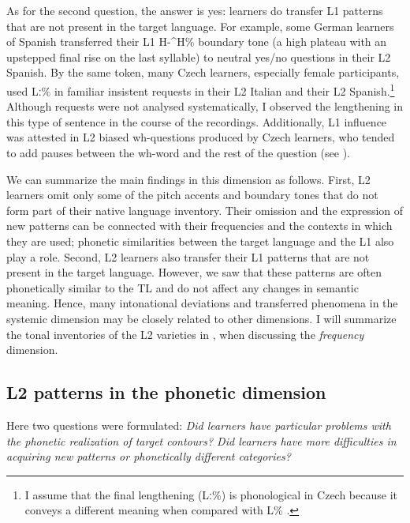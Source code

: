 As for the second question, the answer is yes: learners do transfer L1 patterns that are not present in the target language. For example, some German learners of Spanish transferred their L1 H-\^{}H\% boundary tone (a high plateau with an upstepped final rise on the last syllable) to neutral yes/no questions in their L2 Spanish. By the same token, many Czech learners, especially female participants, used Lː\% in familiar insistent requests in their L2 Italian and their L2 Spanish.\footnote{I assume that the final lengthening (Lː\%) is phonological in Czech because it conveys a different meaning when compared with L\% \citep{PeškováForthcoming}.} Although requests were not analysed systematically, I observed the lengthening in this type of sentence in the course of the recordings. Additionally, L1 influence was attested in L2 biased wh-questions produced by Czech learners, who tended to add pauses between the wh-word and the rest of the question (see \citealt{Pešková2021}).



We can summarize the main findings in this dimension as follows. First, L2 learners omit only some of the pitch accents and boundary tones that do not form part of their native language inventory. Their omission and the expression of new patterns can be connected with their frequencies and the contexts in which they are used; phonetic similarities between the target language and the L1 also play a role. Second, L2 learners also transfer their L1 patterns that are not present in the target language. However, we saw that these patterns are often phonetically similar to the TL and do not affect any changes in semantic meaning. Hence, many intonational deviations and transferred phenomena in the systemic dimension may be closely related to other dimensions. I will summarize the tonal inventories of the L2 varieties in , when discussing the \textit{frequency} dimension.


\subsection{L2 patterns in the phonetic dimension}\label{sec:5.3.2}

Here two questions were formulated: \textit{Did learners have particular problems with the phonetic realization of target contours? Did learners have more difficulties in acquiring new patterns or phonetically different categories?}


